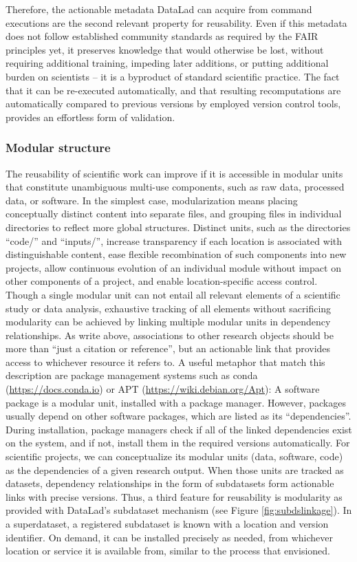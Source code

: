 Therefore, the actionable metadata DataLad can acquire from command executions are the second relevant property for reusability.
Even if this metadata does not follow established community standards as required by the \gls{FAIR} principles yet, it preserves knowledge that would otherwise be lost, without requiring additional training, impeding later additions, or putting additional burden on scientists -- it is a byproduct of standard scientific practice.
The fact that it can be re-executed automatically, and that resulting recomputations are automatically compared to previous versions by employed version control tools, provides an effortless form of validation.


\subsubsection{Modular structure}

The reusability of scientific work can improve if it is accessible in modular units that constitute unambiguous multi-use components, such as raw data, processed data, or software.
In the simplest case, modularization means placing conceptually distinct content into separate files, and grouping files in individual directories to reflect more global structures.
Distinct units, such as the directories ``code/'' and ``inputs/'', increase transparency if each location is associated with distinguishable content, ease flexible recombination of such components into new projects, allow continuous evolution of an individual module without impact on other components of a project, and enable location-specific access control.
Though a single modular unit can not entail all relevant elements of a scientific study or data analysis, exhaustive tracking of all elements without sacrificing modularity can be achieved by linking multiple modular units in dependency relationships.
As \citet{bechhofer2010research} write above, associations to other research objects should be more than ``just a citation or reference'', but an actionable link that provides access to whichever resource it refers to.
A useful metaphor that match this description are package management systems such as conda (\url{https://docs.conda.io}) or APT (\url{https://wiki.debian.org/Apt}): A software package is a modular unit, installed with a package manager.
However, packages usually depend on other software packages, which are listed as its ``dependencies''.
During installation, package managers check if all of the linked dependencies exist on the system, and if not, install them in the required versions automatically.
For scientific projects, we can conceptualize its modular units (data, software, code) as the dependencies of a given research output.
When those units are tracked as datasets, dependency relationships in the form of subdatasets form actionable links with precise versions.
Thus, a third feature for reusability is modularity as provided with DataLad's subdataset mechanism (see Figure \ref{fig:subdslinkage}).
In a superdataset, a registered subdataset is known with a location and version identifier.
On demand, it can be installed precisely as needed, from whichever location or service it is available from, similar to the process that \citet{bechhofer2010research} envisioned.


